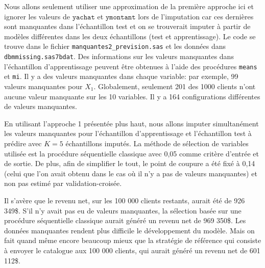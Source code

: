 \documentclass[
  11pt,
  letterpaper,
]{book}
\theoremstyle{definition}
\theoremstyle{definition}
\theoremstyle{definition}
\theoremstyle{remark}
\begin{document}
Nous allons seulement utiliser une approximation de la première approche ici et ignorer les valeurs de \(\texttt{yachat}\) et \(\texttt{ymontant}\) lors de l'imputation car ces dernières sont manquantes dans l'échantillon test et on se trouverait imputer à partir de modèles différentes dans les deux échantillons (test et apprentissage). Le code se trouve dans le fichier \texttt{manquantes2\_prevision.sas} et les données dans \texttt{dbmmissing.sas7bdat}. Des informations sur les valeurs manquantes dans l'échantillon d'apprentissage peuvent être obtenues à l'aide des procédures \texttt{means} et \texttt{mi}. Il y a des valeurs manquantes dans chaque variable: par exemple, 99 valeurs manquantes pour \(X_1\). Globalement, seulement 201 des 1000 clients n'ont aucune valeur manquante sur les 10 variables. Il y a 164 configurations différentes de valeurs manquantes.

En utilisant l'approche 1 présentée plus haut, nous allons imputer simultanément les valeurs manquantes pour l'échantillon d'apprentissage et l'échantillon test à prédire avec \(K=5\) échantillons imputés. La méthode de sélection de variables utilisée est la procédure séquentielle classique avec 0,05 comme critère d'entrée et de sortie. De plus, afin de simplifier le tout, le point de coupure a été fixé à 0,14 (celui que l'on avait obtenu dans le cas où il n'y a pas de valeurs manquantes) et non pas estimé par validation-croisée.

Il s'avère que le revenu net, sur les 100 000 clients restants, aurait été de 926 349\$. S'il n'y avait pas eu de valeurs manquantes, la sélection basée sur une procédure séquentielle classique aurait généré un revenu net de 969 350\$. Les données manquantes rendent plus difficile le développement du modèle. Mais on fait quand même encore beaucoup mieux que la stratégie de référence qui consiste à envoyer le catalogue aux 100 000 clients, qui aurait généré un revenu net de 601 112\$.

  
\end{document}
